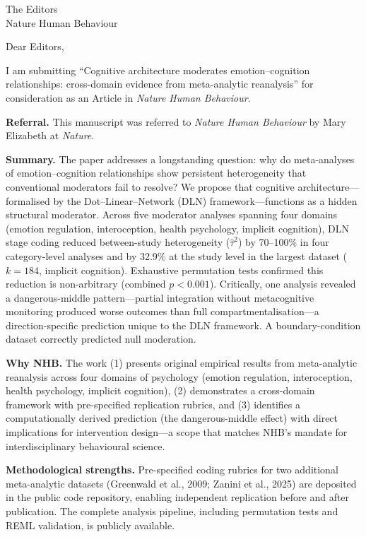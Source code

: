 \documentclass[11pt]{letter}
\date{February 23, 2026}
\begin{document}
\begin{letter}{The Editors\\Nature Human Behaviour}

\opening{Dear Editors,}

I am submitting ``Cognitive architecture moderates emotion--cognition
relationships: cross-domain evidence from meta-analytic reanalysis'' for
consideration as an Article in \textit{Nature Human Behaviour}.

\textbf{Referral.} This manuscript was referred to
\textit{Nature Human Behaviour} by Mary Elizabeth at
\textit{Nature}.

\textbf{Summary.} The paper addresses a longstanding question:
why do meta-analyses of emotion--cognition relationships show
persistent heterogeneity that conventional moderators fail to
resolve? We propose that cognitive architecture---formalised by the
Dot--Linear--Network (DLN) framework---functions as a hidden
structural moderator. Across five moderator analyses spanning four
domains (emotion regulation, interoception, health psychology,
implicit cognition), DLN stage coding reduced between-study
heterogeneity ($\hat\tau^2$) by 70--100\% in four category-level
analyses and by 32.9\% at the study level in the largest dataset
($k = 184$, implicit cognition).
Exhaustive permutation tests confirmed this reduction is
non-arbitrary (combined $p < 0.001$). Critically, one analysis
revealed a dangerous-middle pattern---partial integration without
metacognitive monitoring produced worse outcomes than full
compartmentalisation---a direction-specific prediction unique to
the DLN framework. A boundary-condition dataset correctly predicted
null moderation.

\textbf{Why NHB.} The work (1) presents original empirical
results from meta-analytic reanalysis across four domains of
psychology (emotion regulation, interoception, health psychology,
implicit cognition), (2) demonstrates a cross-domain framework
with pre-specified replication rubrics, and (3) identifies a
computationally derived prediction (the dangerous-middle effect)
with direct implications for intervention design---a scope that
matches NHB's mandate for interdisciplinary behavioural science.

\textbf{Methodological strengths.} Pre-specified coding rubrics
for two additional meta-analytic datasets (Greenwald et al., 2009;
Zanini et al., 2025) are deposited in the public code repository,
enabling independent replication before and after publication. The
complete analysis pipeline, including permutation tests and REML
validation, is publicly available.


\end{letter}
\end{document}
